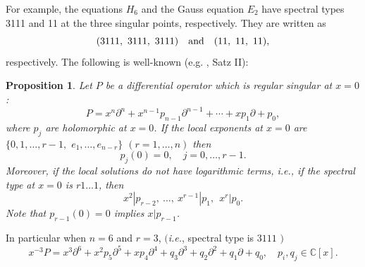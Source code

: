 \documentclass[a4paper,12pt]{article}
\newtheorem{cor}[thm]{Corollary}
\newtheorem{prp}[thm]{Proposition}
\theoremstyle{definition}
\theoremstyle{remark}
\numberwithin{equation}{section} %
\def\comment#1{ }
\begin{document}
For example, the equations $H_6$ and the Gauss equation $E_2$ have spectral types 3111 and 11 at the three singular points, respectively. They are written as
  $$(3111,\ 3111,\ 3111)\quad{\rm and}\quad (11,\ 11,\ 11),$$
respectively.
The following is well-known (e.g. \cite{Heffter}, Satz II): 
\begin{prp}\label{nologcond}
  Let $P$ be a differential operator which is  regular singular at $x=0$:
  $$P=x^n\partial^{n}+x^{n-1}p_{n-1}\partial^{n-1}+\cdots+xp_1\partial+p_0,$$
  where $p_j$ are holomorphic at $x=0$. If the local exponents at $x=0$
  are $\{0,1,\dots,r-1,$ $e_1,\dots,e_{n-r}\}$ $(r=1,\ldots, n)$ 
then
$$p_j(0)=0,\quad j=0,\dots,r-1.$$
  Moreover, if the local solutions do not have logarithmic terms, {\it i.e.},
  if the spectral type at $x=0$ is $r1\dots1$, then
  $$x^2|p_{r-2},\ \dots,\ x^{r-1}|p_1,\ \ x^{r}|p_0.$$
Note that $p_{r-1}(0)=0$ implies $x|p_{r-1}$.

\end{prp}
\comment{
\begin{proof} %
For notational simplicity we let $n=6$ and $r=2$. Set
  $$p_j=p_{j0}+p_{j1}x+p_{j2}x^2+\cdots,\quad u=u_0+u_1x+u_2x^2+\cdots$$
Then 
\[ \def\arraystretch{1.1}
\begin{array}{c}
Pu=(p_{00}+p_{01}x+p_{02}x^2+p_{03}x^3+\cdots)(u_0+u_1x+u_2x^2+u_3x^3+\cdots)\\
+x(p_{10}+p_{11}x+p_{12}x^2+\cdots)(u_1+2u_2x+3u_3x^2+\cdots)\\
+x^2(p_{20}+p_{21}x+\cdots)(2u_2+3!u_3x+\cdots)\\
+x^3(p_{30}+\cdots)(3!u_3+\cdots)+\cdots,
\end{array}\]
where
  $$p_{00}=p_{10}=p_{20}=0.$$
The solutions have no logarithmic term  if and only if for arbitrary $u_0,u_1$
and $u_2$, the coefficients $u_3,u_4,\dots$ are uniquely determined
by $Pu=0$.
The coefficient of $x$ is $p_{01}u_0$,
that of $x^2$ is $p_{01}u_1+p_{02}u_0+p_{11}u_1$. Thus we have
  $$p_{01}=p_{02}=p_{11}=0.$$
Since the genericity of the local exponents asserts $p_{30}\not=0$, the vanishing of the coefficient of $x^3$ determines $u_3$
as a linear form of $\{u_0,u_1,u_2\}$, and so on.
\end{proof} %
\begin{cor}\label{nologcondcor}
  Let $P$ be as above. Set
  $$p_r=xq_r,\  p_{r-1}=x^2q_{r-1},\ \dots,\ p_1=x^rq_1,\ p_0=x^{r+1}q_0,$$
  where $q_0,\dots,q_r$ are holomorphic at $x=0$. Then $P$ has
  the following expression:
  $$x^{-r-1}P=x^{n-r-1}\partial^n+x^{n-r-2}p_{n-1}\partial^{n-1}+\cdots+p_{r+1}\partial^{r+1}+q_r\partial^r+\cdots+q_1\partial+q_0.  $$
\end{cor}}
  In particular when $n=6$ and $r=3$, $(${\it i.e.},
  spectral type is $3111$ $)$
  $$x^{-3}P=x^3\partial^6+x^2p_5\partial^5+xp_4\partial^4+q_3\partial^3+q_2\partial^2+q_1\partial+q_0,\quad p_i,q_j\in\mathbb{C}[x].
  $$
  
\end{document}
